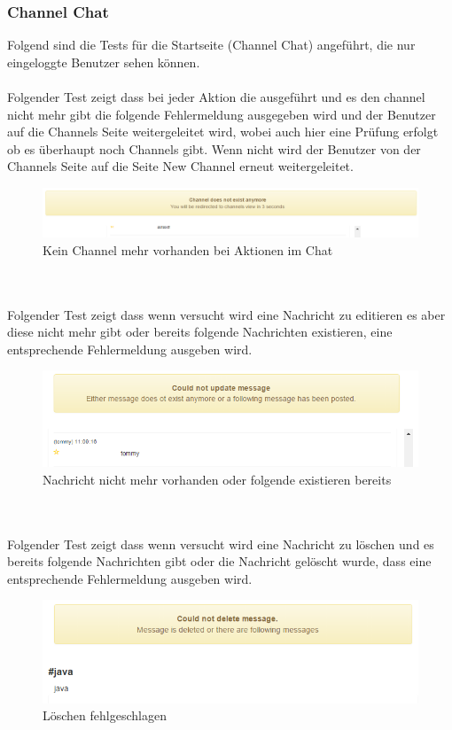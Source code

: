 \documentclass[11pt, a4paper, twoside]{article}   	%
\begin{document}
\subsubsection{Channel Chat}
Folgend sind die Tests für die Startseite (Channel Chat) angeführt, die nur eingeloggte Benutzer sehen können.\\\\
Folgender Test zeigt dass bei jeder Aktion die ausgeführt und es den channel nicht mehr gibt die folgende Fehlermeldung ausgegeben wird und der Benutzer auf die Channels Seite weitergeleitet wird, wobei auch hier eine Prüfung erfolgt ob es überhaupt noch Channels gibt. Wenn nicht wird der Benutzer von der Channels Seite auf die Seite New Channel erneut weitergeleitet.
\begin{figure}[h]
	\centering
	\includegraphics[scale=0.5]{images/start_channel_chat_no_channel_on_action.PNG}
	\caption
	{Kein Channel mehr vorhanden bei Aktionen im Chat}
\end{figure}\\\\

Folgender Test zeigt dass wenn versucht wird eine Nachricht zu editieren es aber diese nicht mehr gibt oder bereits folgende Nachrichten existieren, eine entsprechende Fehlermeldung ausgeben wird.
\begin{figure}[h]
	\centering
	\includegraphics[scale=0.5]{images/start_channel_chat_no_message_or_following.PNG}
	\caption
	{Nachricht nicht mehr vorhanden oder folgende existieren bereits}
\end{figure}\\\\

Folgender Test zeigt dass wenn versucht wird eine Nachricht zu löschen und es bereits folgende Nachrichten gibt oder die Nachricht gelöscht wurde, dass eine entsprechende Fehlermeldung ausgeben wird.
\begin{figure}[h]
	\centering
	\includegraphics[scale=0.5]{images/start_channel_chat_delete_following_messages.PNG}
	\caption
	{Löschen fehlgeschlagen}
\end{figure}\\\\
\newpage
\end{document}
